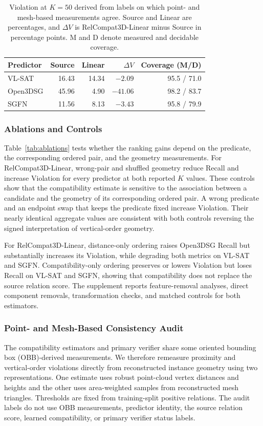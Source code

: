 \begin{table}[t]
\centering
{\small
\setlength{\tabcolsep}{1.5pt}
\begin{tabular}{@{}lrrrr@{}}
\toprule
Predictor & Source & Linear & $\Delta V$ & Coverage (M/D) \\
\midrule
VL-SAT   & 16.43 & 14.34 & $-2.09$ & 95.5 / 71.0 \\
Open3DSG & 45.96 & 4.90  & $-41.06$ & 98.2 / 83.7 \\
SGFN     & 11.56 & 8.13  & $-3.43$ & 95.8 / 79.9 \\
\bottomrule
\end{tabular}
}
\caption{Violation at $K=50$ derived from labels on which point- and mesh-based measurements agree. Source and Linear are percentages, and $\Delta V$ is RelCompat3D-Linear minus Source in percentage points. M and D denote measured and decidable coverage.}
\label{tab:surface-audit}
\end{table}

\subsubsection{Ablations and Controls}
Table~\ref{tab:ablations} tests whether the ranking gains depend on the predicate, the corresponding ordered pair, and the geometry measurements. For RelCompat3D-Linear, wrong-pair and shuffled geometry reduce Recall and increase Violation for every predictor at both reported $K$ values. These controls show that the compatibility estimate is sensitive to the association between a candidate and the geometry of its corresponding ordered pair. A wrong predicate and an endpoint swap that keeps the predicate fixed increase Violation. Their nearly identical aggregate values are consistent with both controls reversing the signed interpretation of vertical-order geometry.

For RelCompat3D-Linear, distance-only ordering raises Open3DSG Recall but substantially increases its Violation, while degrading both metrics on VL-SAT and SGFN. Compatibility-only ordering preserves or lowers Violation but loses Recall on VL-SAT and SGFN, showing that compatibility does not replace the source relation score.
The supplement reports feature-removal analyses, direct component removals, transformation checks, and matched controls for both estimators.

\subsubsection{Point- and Mesh-Based Consistency Audit}
The compatibility estimators and primary verifier share some oriented bounding box (OBB)-derived measurements. We therefore remeasure proximity and vertical-order violations directly from reconstructed instance geometry using two representations. One estimate uses robust point-cloud vertex distances and heights and the other uses area-weighted samples from reconstructed mesh triangles. Thresholds are fixed from training-split positive relations. The audit labels do not use OBB measurements, predictor identity, the source relation score, learned compatibility, or primary verifier status labels.

